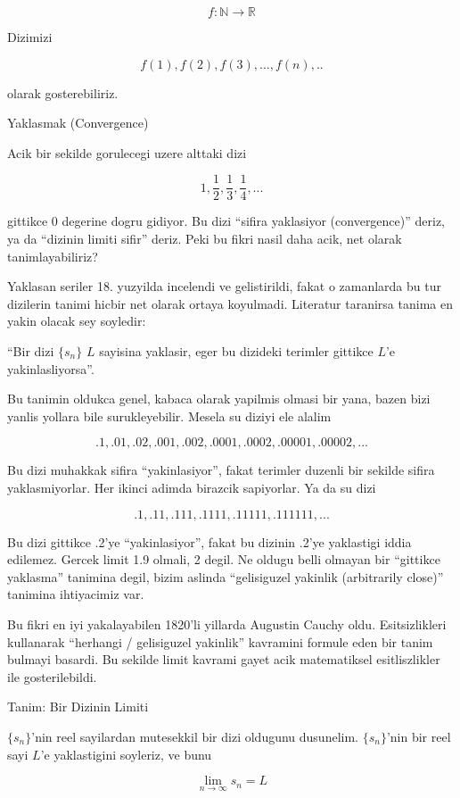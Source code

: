 \documentclass[12pt,fleqn]{article}\usepackage{../common}
\begin{document}
\[ f: \mathbb{N} \to \mathbb{R} \]

Dizimizi 

\[ f(1),f(2),f(3),...,f(n),.. \]

olarak gosterebiliriz. 

Yaklasmak (Convergence) 

Acik bir sekilde gorulecegi uzere alttaki dizi

\[ 1,\frac{1}{2},\frac{1}{3},\frac{1}{4},... \]

gittikce 0 degerine dogru gidiyor. Bu dizi ``sifira yaklasiyor
(convergence)'' deriz, ya da ``dizinin limiti sifir'' deriz. Peki bu fikri
nasil daha acik, net olarak tanimlayabiliriz? 

Yaklasan seriler 18. yuzyilda incelendi ve gelistirildi, fakat o zamanlarda
bu tur dizilerin tanimi hicbir net olarak ortaya koyulmadi. Literatur
taranirsa tanima en yakin olacak sey soyledir:

``Bir dizi $\{s_n\}$ $L$ sayisina yaklasir, eger bu dizideki terimler
gittikce $L$'e yakinlasliyorsa''. 

Bu tanimin oldukca genel, kabaca olarak yapilmis olmasi bir yana, bazen
bizi yanlis yollara bile surukleyebilir. Mesela su diziyi ele alalim 

\[ .1, .01, .02, .001, .002, .0001, .0002, .00001, .00002, ... \]

Bu dizi muhakkak sifira ``yakinlasiyor'', fakat terimler duzenli bir sekilde
sifira yaklasmiyorlar. Her ikinci adimda birazcik sapiyorlar. Ya da su dizi

\[ .1, .11, .111, .1111, .11111, .111111, ... \]

Bu dizi gittikce .2'ye ``yakinlasiyor'', fakat bu dizinin .2'ye yaklastigi
iddia edilemez. Gercek limit 1.9 olmali, 2 degil. Ne oldugu belli olmayan
bir ``gittikce yaklasma'' tanimina degil, bizim aslinda ``gelisiguzel
yakinlik (arbitrarily close)'' tanimina ihtiyacimiz var.

Bu fikri en iyi yakalayabilen 1820'li yillarda Augustin Cauchy
oldu. Esitsizlikleri kullanarak ``herhangi / gelisiguzel yakinlik''
kavramini formule eden bir tanim bulmayi basardi. Bu sekilde limit kavrami
gayet acik matematiksel esitliszlikler ile gosterilebildi.

Tanim: Bir Dizinin Limiti 

$\{s_n\}$'nin reel sayilardan mutesekkil bir dizi oldugunu
dusunelim. $\{s_n\}$'nin bir reel sayi $L$'e yaklastigini soyleriz, ve bunu

\[ \lim_{n\to\infty} s_n = L \]
\end{document}
